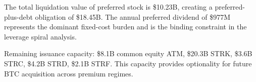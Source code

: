 The total liquidation value of preferred stock is \$10.23B, creating
a preferred-plus-debt obligation of \$18.45B.  The annual preferred
dividend of \$977M represents the dominant fixed-cost burden and is
the binding constraint in the leverage spiral analysis.

Remaining issuance capacity: \$8.1B common equity ATM, \$20.3B STRK,
\$3.6B STRC, \$4.2B STRD, \$2.1B STRF.  This capacity provides
optionality for future BTC acquisition across premium regimes.
